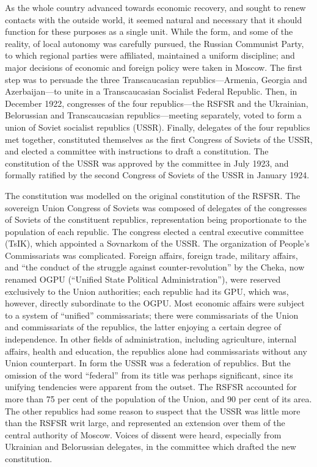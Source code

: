 As the whole country advanced towards economic recovery, and sought to renew contacts with the outside world, it seemed natural and necessary that it should function for these purposes as a single unit. While the form, and some of the reality, of local autonomy was carefully pursued, the Russian Communist Party, to which regional parties were affiliated, maintained a uniform discipline; and major decisions of economic and foreign policy were taken in Moscow. The first step was to persuade the three Transcaucasian republics---Armenia, Georgia and Azerbaijan---to unite in a Transcaucasian Socialist Federal Republic. Then, in December 1922, congresses of the four republics---the RSFSR and the Ukrainian, Belorussian and Transcaucasian republics---meeting separately, voted to form a union of Soviet socialist republics (USSR). Finally, delegates of the four republics met together, constituted themselves as the first Congress of Soviets of the USSR, and elected a committee with instructions to draft a constitution. The constitution of the USSR was approved by the committee in July 1923, and formally ratified by the second Congress of Soviets of the USSR in January 1924. 

The constitution was modelled on the original constitution of the RSFSR. The sovereign Union Congress of Soviets was composed of delegates of the congresses of Soviets of the constituent republics, representation being proportionate to the population of each republic. The congress elected a central executive committee (TsIK), which appointed a Sovnarkom of the USSR. The organization of People's Commissariats was complicated. Foreign affairs, foreign trade, military affairs, and ``the conduct of the struggle against counter-revolution'' by the Cheka, now renamed OGPU (``Unified State Political Administration''), were reserved exclusively to the Union authorities; each republic had its GPU, which was, however, directly subordinate to the OGPU. Most economic affairs were subject to a system of ``unified'' commissariats; there were commissariats of the Union and commissariats of the republics, the latter enjoying a certain degree of independence. In other fields of administration, including agriculture, internal affairs, health and education, the republics alone had commissariats without any Union counterpart. In form the USSR was a federation of republics. But the omission of the word ``federal'' from its title was perhaps significant, since its unifying tendencies were apparent from the outset. The RSFSR accounted for more than 75 per cent of the population of the Union, and 90 per cent of its area. The other republics had some reason to suspect that the USSR was little more than the RSFSR writ large, and represented an extension over them of the central authority of Moscow. Voices of dissent were heard, especially from Ukrainian and Belorussian delegates, in the committee which drafted the new constitution. 

